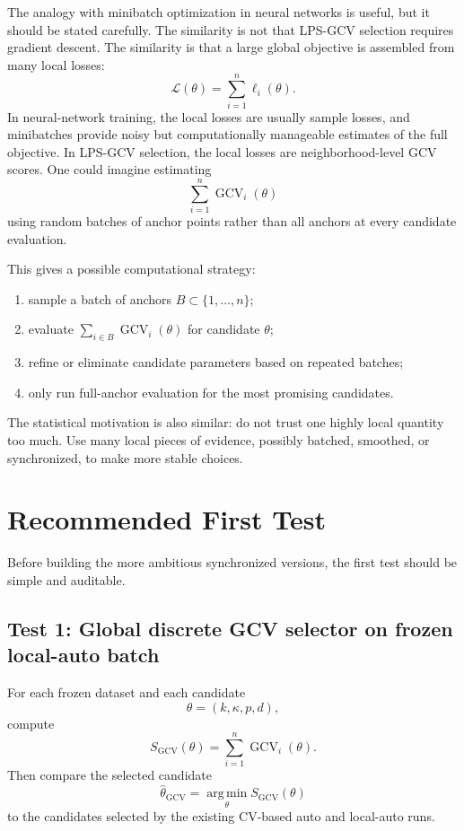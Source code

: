 \documentclass[11pt]{article}
\newcommand{\GCV}{\operatorname{GCV}}
\newcommand{\argmin}{\operatorname*{arg\,min}}
\begin{document}
The analogy with minibatch optimization in neural networks is useful, but it
should be stated carefully.  The similarity is not that LPS-GCV selection
requires gradient descent.  The similarity is that a large global objective is
assembled from many local losses:
\[
  \mathcal L(\theta)
  =
  \sum_{i=1}^{n}\ell_i(\theta).
\]
In neural-network training, the local losses are usually sample losses, and
minibatches provide noisy but computationally manageable estimates of the full
objective.  In LPS-GCV selection, the local losses are neighborhood-level GCV
scores.  One could imagine estimating
\[
  \sum_{i=1}^{n}\GCV_i(\theta)
\]
using random batches of anchor points rather than all anchors at every
candidate evaluation.

This gives a possible computational strategy:

\begin{enumerate}[leftmargin=*]
  \item sample a batch of anchors \(B\subset\{1,\ldots,n\}\);
  \item evaluate \(\sum_{i\in B}\GCV_i(\theta)\) for candidate \(\theta\);
  \item refine or eliminate candidate parameters based on repeated batches;
  \item only run full-anchor evaluation for the most promising candidates.
\end{enumerate}

The statistical motivation is also similar: do not trust one highly local
quantity too much.  Use many local pieces of evidence, possibly batched,
smoothed, or synchronized, to make more stable choices.

\section{Recommended First Test}

Before building the more ambitious synchronized versions, the first test should
be simple and auditable.

\subsection*{Test 1: Global discrete GCV selector on frozen local-auto batch}

For each frozen dataset and each candidate
\[
  \theta=(k,\kappa,p,d),
\]
compute
\[
  S_{\mathrm{GCV}}(\theta)
  =
  \sum_{i=1}^{n}\GCV_i(\theta).
\]
Then compare the selected candidate
\[
  \widehat\theta_{\mathrm{GCV}}
  =
  \argmin_{\theta} S_{\mathrm{GCV}}(\theta)
\]
to the candidates selected by the existing CV-based auto and local-auto runs.
\end{document}
